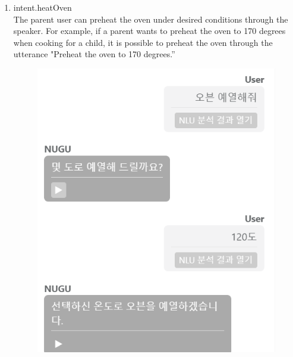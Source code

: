 \documentclass[conference]{IEEEtran}
\begin{document}
\begin{enumerate}
\begin{enumerate}
\begin{enumerate}
                \item intent.heatOven
                \\The parent user can preheat the oven under desired conditions through the speaker. For example, if a parent wants to preheat the oven to 170 degrees when cooking for a child, it is possible to preheat the oven through the utterance "Preheat the oven to 170 degrees.”\newline
                \begin{figure}[H]
                \centering
                \includegraphics[scale=0.5]{new_assets/nugu-play-oven.png}
                \end{figure}
                

\end{enumerate}
\end{enumerate}
\end{enumerate}
\end{document}
